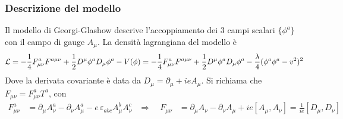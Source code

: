 \subsubsection{Descrizione del modello}
Il modello di Georgi-Glashow descrive l'accoppiamento dei 3 campi scalari
$\{\phi^a\}$ con il campo di gauge $A_\mu$. La densità lagrangiana del modello è
\begin{equation}
   \mathcal{L} = - \frac{1}{4} F^a_{\mu\nu}F^{a\mu\nu}
                 + \frac{1}{2} D^\mu\phi^a D_\mu \phi^a - V(\phi)
               = - \frac{1}{4} F^a_{\mu\nu}F^{a\mu\nu}
                 + \frac{1}{2} D^\mu\phi^a D_\mu \phi^a
                 - \frac{\lambda}{4}( \phi^a\phi^a - v^2 )^2
\end{equation}
Dove la derivata covariante è data da $D_\mu = \partial _\mu + ie A_\mu$.
Si richiama che $F_{\mu\nu} = F^a_{\mu\nu} T^a$, con
\begin{equation}
   \begin{aligned}
   F^a_{\mu\nu} & = \partial _\mu A_\nu^a - \partial _\nu A^a_\mu
                   - e \, \varepsilon_{abc} A_\mu^b A_\nu^c
   & \Rightarrow \quad
   F_{\mu\nu}  & = \partial _\mu A_\nu - \partial _\nu A_\mu + ie [A_\mu,A_\nu]
                = \frac{1}{ie}[D_\mu , D_\nu]
  \end{aligned}
\end{equation}

